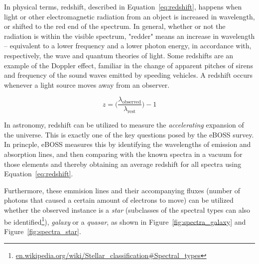 In physical terms, redshift, described in Equation~\ref{eq:redshift}, happens when light or other electromagnetic radiation from an object is increased in wavelength, or shifted to the red end of the spectrum. In general, whether or not the radiation is within the visible spectrum, "redder" means an increase in wavelength – equivalent to a lower frequency and a lower photon energy, in accordance with, respectively, the wave and quantum theories of light. Some redshifts are an example of the Doppler effect, familiar in the change of apparent pitches of sirens and frequency of the sound waves emitted by speeding vehicles. A redshift occurs whenever a light source moves away from an observer.

\begin{equation}
  z = \Bigg(\frac{\lambda_\text{observed}}{\lambda_\text{rest}}\Bigg) - 1
  \label{eq:redshift}
\end{equation}

In astronomy, redshift can be utilized to measure the \emph{accelerating} expansion of the universe. This is exactly one of the key questions posed by the eBOSS survey. In princple, eBOSS measures this by identifying the wavelengths of emission and absorption lines, and then comparing with the known spectra in a vacuum for those elements and thereby obtaining an average redshift for all spectra using Equation~\ref{eq:redshift}.

\begin{figure}[H]
  \centering
\end{figure}

Furthermore, these emmision lines and their accompanying fluxes (number of photons that caused a certain amount of electrons to move) can be utilized whether the observed instance is a \emph{star} (subclasses of the spectral types can also be identified\footnote{\href{https://en.wikipedia.org/wiki/Stellar\_classification\#Spectral\_types}{en.wikipedia.org/wiki/Stellar\_classification\#Spectral\_types}}), \emph{galaxy} or a \emph{quasar}, as shown in Figure~\ref{fig:spectra_galaxy} and Figure~\ref{fig:spectra_star}.

